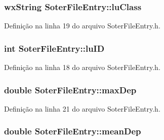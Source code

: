 \subsubsection[{lu\+Class}]{\setlength{\rightskip}{0pt plus 5cm}wx\+String Soter\+File\+Entry\+::lu\+Class\hspace{0.3cm}{\ttfamily [protected]}}\label{class_soter_file_entry_a52fd72c2944ee15b9021fb24c90e2eb0}


Definição na linha 19 do arquivo Soter\+File\+Entry.\+h.

\subsubsection[{lu\+ID}]{\setlength{\rightskip}{0pt plus 5cm}int Soter\+File\+Entry\+::lu\+ID\hspace{0.3cm}{\ttfamily [protected]}}\label{class_soter_file_entry_a152bca4d1e0f7c71438a3acda02494d3}


Definição na linha 18 do arquivo Soter\+File\+Entry.\+h.

\subsubsection[{max\+Dep}]{\setlength{\rightskip}{0pt plus 5cm}double Soter\+File\+Entry\+::max\+Dep\hspace{0.3cm}{\ttfamily [protected]}}\label{class_soter_file_entry_a3aaba410c2064e688d1af6b1b5984acf}


Definição na linha 21 do arquivo Soter\+File\+Entry.\+h.

\subsubsection[{mean\+Dep}]{\setlength{\rightskip}{0pt plus 5cm}double Soter\+File\+Entry\+::mean\+Dep\hspace{0.3cm}{\ttfamily [protected]}}\label{class_soter_file_entry_a34ab4fd40859fc8678d3c7b4e6b4428d}



